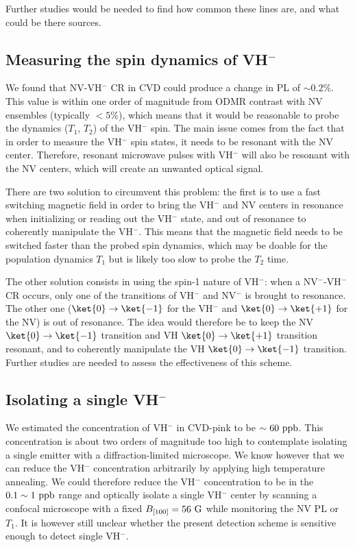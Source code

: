 \documentclass[a4paper, 11pt]{book}
\begin{document}
Further studies would be needed to find how common these lines are, and what could be there sources.

\subsection{Measuring the spin dynamics of VH$^-$}

We found that NV-VH$^-$ CR in CVD could produce a change in PL of $\sim 0.2 \%$. This value is within one order of magnitude from ODMR contrast with NV ensembles (typically $<5 \%$), which means that it would be reasonable to probe the dynamics ($T_1$, $T_2$) of the VH$^-$ spin. The main issue comes from the fact that in order to measure the VH$^-$ spin states, it needs to be resonant with the NV center. Therefore, resonant microwave pulses with VH$^-$ will also be resonant with the NV centers, which will create an unwanted optical signal.

There are two solution to circumvent this problem: the first is to use a fast switching magnetic field in order to bring the VH$^-$ and NV centers in resonance when initializing or reading out the VH$^-$ state, and out of resonance to coherently manipulate the VH$^-$. This means that the magnetic field needs to be switched faster than the probed spin dynamics, which may be doable for the population dynamics $T_1$ but is likely too slow to probe the $T_2$ time.

The other solution consists in using the spin-1 nature of VH$^-$: when a NV$^-$-VH$^-$ CR occurs, only one of the transitions of VH$^-$ and NV$^-$ is brought to resonance. The other one ($\ket{0} \to \ket{-1}$ for the VH$^-$ and $\ket{0} \to \ket{+1}$ for the NV) is out of resonance. The idea would therefore be to keep the NV $\ket{0} \to \ket{-1}$ transition and VH $\ket{0} \to \ket{+1}$ transition resonant, and to coherently manipulate the VH $\ket{0} \to \ket{-1}$ transition. Further studies are needed to assess the effectiveness of this scheme.

\subsection{Isolating a single VH$^-$}

We estimated the concentration of VH$^-$ in CVD-pink to be $\sim 60\ \rm ppb$. This concentration is about two orders of magnitude too high to contemplate isolating a single emitter with a diffraction-limited microscope. We know however that we can reduce the VH$^-$ concentration arbitrarily by applying high temperature annealing. We could therefore reduce the VH$^-$ concentration to be in the $0.1 \sim 1\ \rm ppb$ range and optically isolate a single VH$^-$ center by scanning a confocal microscope with a fixed $B_{[100]}=56\ \rm G$ while monitoring the NV PL or $T_1$. It is however still unclear whether the present detection scheme is sensitive enough to detect single VH$^-$.
\end{document}

